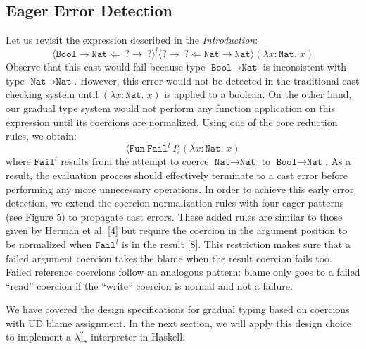 \subsection{Eager Error Detection}
Let us revisit the expression described in the \textit{Introduction}:
\begin{equation*}
    \langle \texttt{Bool} \rightarrow \texttt{Nat} \Leftarrow  
    \: ? \rightarrow \: ? \rangle ^l 
    \langle ? \rightarrow \: ? \Leftarrow 
    \texttt{Nat} \rightarrow \texttt{Nat} \rangle
    (\lambda x \! : \! \texttt{Nat} . \; x)
\end{equation*}
Observe that this cast would fail because type $\texttt{Bool} \rightarrow 
\texttt{Nat}$ is inconsistent with type $\texttt{Nat} \rightarrow 
\texttt{Nat}$. However, this error would not be detected in the traditional 
cast checking system until $(\lambda x \! : \! \texttt{Nat} . \; x)$ is 
applied to a boolean. On the other hand, our gradual type system would not 
perform any function application on this expression until its coercions are 
normalized. Using one of the core reduction rules, we obtain:
\begin{equation*}
    \langle \texttt{Fun} \: \texttt{Fail}^l \: I \rangle
    (\lambda x \! : \! \texttt{Nat} . \; x)
\end{equation*}
where $\texttt{Fail}^l$ results from the attempt to coerce $\texttt{Nat} \rightarrow 
\texttt{Nat}$ to $\texttt{Bool} \rightarrow \texttt{Nat}$. As a result, 
the evaluation process should effectively terminate to a cast error before 
performing any more unnecessary operations. In order to achieve this 
early error detection, we extend the coercion normalization rules with 
four eager patterns (see Figure 5) to propagate cast errors. These added rules are similar to 
those given by Herman et al. [4] but require the coercion in the argument 
position to be normalized when $\texttt{Fail}^l$ is in the result [8]. 
This restriction makes sure that a failed argument coercion takes the blame when 
the result coercion fails too. Failed reference coercions follow an 
analogous pattern: blame only goes to a failed ``read'' coercion if 
the ``write'' coercion is normal and not a failure.

We have covered the design specifications for gradual typing based on coercions 
with UD blame assignment. In the next section, we will apply this design choice 
to implement a $\lambda ^? _{\rightarrow}$ interpreter in Haskell. 